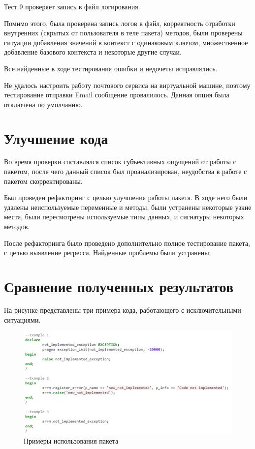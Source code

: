 Тест 9 проверяет запись в файл логирования. 

Помимо этого, была проверена запись логов в файл, корректность отработки внутренних (скрытых от пользователя в теле пакета) методов, были проверены ситуации добавления значений в контекст с одинаковым ключом, множественное добавление базового контекста и некоторые другие случаи.

Все найденные в ходе тестирования ошибки и недочеты исправлялись. 

Не удалось настроить работу почтового сервиса на виртуальной машине, поэтому тестирование отправки Email сообщение провалилось. Данная опция была отключена по умолчанию. 

\section{Улучшение кода} \label{ch4:sec3}

Во время проверки составлялся список субъективных ощущений от работы с пакетом, после чего данный список был проанализирован, неудобства в работе с пакетом скорректированы. 

Был проведен рефакторинг с целью улучшения работы пакета. В ходе него были удалены неиспользуемые переменные и методы, были устранены некоторые узкие места, были пересмотрены используемые типы данных, и сигнатуры некоторых методов.

После рефакторинга было проведено дополнительно полное тестирование пакета, с целью выявление регресса. Найденные проблемы были устранены. 


\section{Сравнение полученных результатов} \label{ch4:sec4}

На рисунке  представлены три примера кода, работающего с исключительными ситуациями. 

\begin{figure}[ht!] 
	\center
	\includegraphics [scale=1] {my_folder/img/c4_examples.png}
	\caption{Примеры использования пакета} 
	\label{fig:c4_examples}  
\end{figure}
\FloatBarrier

